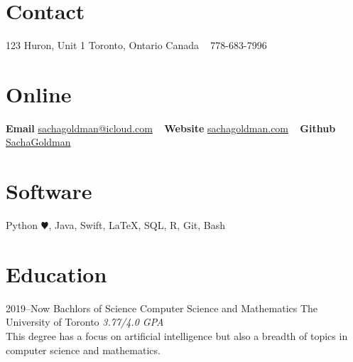 \documentclass[]{style}
\begin{document}


\begin{aside} %
\section{Contact}
123 Huron, Unit 1
Toronto, Ontario
Canada 
~ \vspace{-2mm}
778-683-7996
\section{Online}
\textbf{Email}
\href{mailto:sachagoldman@icloud.com}{sachagoldman@icloud.com} 
~ \vspace{-2mm}
\textbf{Website} 
\href{https://sachagoldman.com}{sachagoldman.com} 
~ \vspace{-2mm}
\textbf{Github}
\href{https://github.com/SachaGoldman}{SachaGoldman}
\section{Software}
Python {\color{red} $\varheartsuit$}, Java,
Swift, \LaTeX, SQL, 
R, Git, Bash
\end{aside}


\section{Education}

\begin{entrylist}


\entry
{2019–Now}
{Bachlors of Science {\normalfont Computer Science and Mathematics}}
{The University of Toronto}
{\emph{3.77/4.0 GPA} \\ This degree has a focus on artificial intelligence but also a breadth of topics in computer science and mathematics.}


\end{entrylist}
\end{document}
